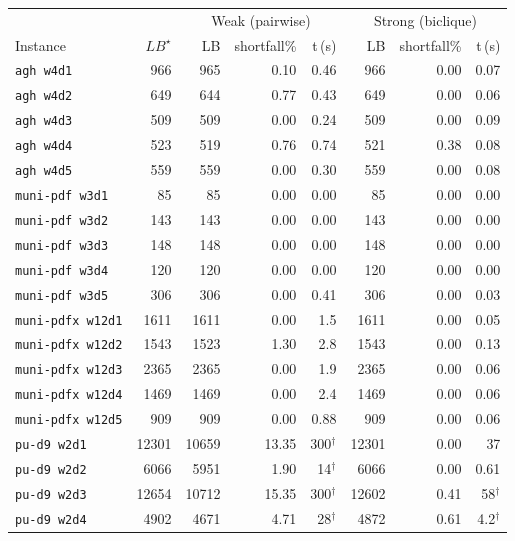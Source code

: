 \documentclass[11pt]{article}
\begin{document}
\begin{table}[ht]
\centering
\scriptsize
\setlength{\tabcolsep}{4pt}
\begin{tabular}{@{}lr rrr rrr@{}}
\hline
 & & \multicolumn{3}{c}{Weak (pairwise)} & \multicolumn{3}{c}{Strong (biclique)} \\
Instance & $LB^\star$ & LB & shortfall\% & t\,(s) & LB & shortfall\% & t\,(s) \\
\hline
\texttt{agh w4d1} & 966 & 965 & 0.10 & 0.46 & 966 & 0.00 & 0.07 \\
\texttt{agh w4d2} & 649 & 644 & 0.77 & 0.43 & 649 & 0.00 & 0.06 \\
\texttt{agh w4d3} & 509 & 509 & 0.00 & 0.24 & 509 & 0.00 & 0.09 \\
\texttt{agh w4d4} & 523 & 519 & 0.76 & 0.74 & 521 & 0.38 & 0.08 \\
\texttt{agh w4d5} & 559 & 559 & 0.00 & 0.30 & 559 & 0.00 & 0.08 \\
\texttt{muni-pdf w3d1} & 85 & 85 & 0.00 & 0.00 & 85 & 0.00 & 0.00 \\
\texttt{muni-pdf w3d2} & 143 & 143 & 0.00 & 0.00 & 143 & 0.00 & 0.00 \\
\texttt{muni-pdf w3d3} & 148 & 148 & 0.00 & 0.00 & 148 & 0.00 & 0.00 \\
\texttt{muni-pdf w3d4} & 120 & 120 & 0.00 & 0.00 & 120 & 0.00 & 0.00 \\
\texttt{muni-pdf w3d5} & 306 & 306 & 0.00 & 0.41 & 306 & 0.00 & 0.03 \\
\texttt{muni-pdfx w12d1} & 1611 & 1611 & 0.00 & 1.5 & 1611 & 0.00 & 0.05 \\
\texttt{muni-pdfx w12d2} & 1543 & 1523 & 1.30 & 2.8 & 1543 & 0.00 & 0.13 \\
\texttt{muni-pdfx w12d3} & 2365 & 2365 & 0.00 & 1.9 & 2365 & 0.00 & 0.06 \\
\texttt{muni-pdfx w12d4} & 1469 & 1469 & 0.00 & 2.4 & 1469 & 0.00 & 0.06 \\
\texttt{muni-pdfx w12d5} & 909 & 909 & 0.00 & 0.88 & 909 & 0.00 & 0.06 \\
\texttt{pu-d9 w2d1} & 12301 & 10659 & 13.35 & 300$^\dagger$ & 12301 & 0.00 & 37 \\
\texttt{pu-d9 w2d2} & 6066 & 5951 & 1.90 & 14$^\dagger$ & 6066 & 0.00 & 0.61 \\
\texttt{pu-d9 w2d3} & 12654 & 10712 & 15.35 & 300$^\dagger$ & 12602 & 0.41 & 58$^\dagger$ \\
\texttt{pu-d9 w2d4} & 4902 & 4671 & 4.71 & 28$^\dagger$ & 4872 & 0.61 & 4.2$^\dagger$ \\

\end{tabular}
\end{table}
\end{document}
